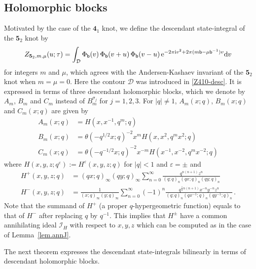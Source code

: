 \documentclass[12pt,reqno]{amsart}
\theoremstyle{definition}
\def\calI{\mathcal I}
\def\calI{\mathcal I}
\def\s{\sigma}
\def\th{\theta}
\def\ve{\varepsilon}
\def\bb{\mathsf{b}}
\def\ri{\mathrm{i}}
\def\rd{\mathrm{d}}
\def\re{{\rm e}}
\def\ri{{\rm i}}
\def\rd{{\rm d}}
\def\mc{\mathcal}
\def\md{\mathbf}
\newcommand{\knot}[1]{\md{#1}}
\begin{document}
\subsection{Holomorphic blocks}
\label{sub.52holo}

Motivated by the case of the $\knot{4}_1$ knot, we define the descendant
state-integral of the $\knot{5}_2$ knot by 
\begin{equation}
  \label{Z52x-desc}
  Z_{\knot{5}_2,m,\mu}(u;\tau) =
  \int_{\mc{D}}  \Phi_\bb(v) \, \Phi_\bb(v+u)
  \, \Phi_\bb(v-u) \, \re^{-2\pi \ri v^2+ 2\pi(m \bb - \mu
    \bb^{-1})v} \rd v 
\end{equation}
for integers $m$ and $\mu$, which agrees with the
Andersen-Kashaev invariant of the $\knot{5}_2$ knot when
$m=\mu=0$. Here the contour
$\mc{D}$ was introduced in \eqref{Z410-desc}. It is expressed in terms of three descendant
holomorphic blocks, which we denote by $A_m$, $B_m$ and $C_m$ instead
of $B^{\s_j}_m$ for $j=1,2,3$.  For $|q| \neq 1$, $A_m(x;q)$,
$B_m(x;q)$ and $C_m(x;q)$ are given by
\begin{subequations}
\begin{align}
  \label{Am}
  A_m(x;q) &=  H(x,x^{-1},q^m;q) \\
  \label{Bm}
  B_m(x;q) &= \th(-q^{1/2}x;q)^{-2}x^m H(x,x^{2},q^m x^2;q) \\
  \label{Cm}
  C_m(x;q) &= \th(-q^{-1/2}x;q)^{-2} x^{-m} H(x^{-1},x^{-2},q^m x^{-2};q)
\end{align}
\end{subequations}
where $H(x,y,z;q^\ve):=H^\ve(x,y,z;q)$ for $|q|<1$ and $\ve=\pm$ and
\begin{subequations}
  \begin{align}
\label{H52p}
H^+(x,y,z;q) & = (qx;q)_\infty (qy;q)_\infty \sum_{n=0}^\infty
\frac{q^{n(n+1)} z^n}{(q;q)_n (qx;q)_n (qy;q)_n} \\
\label{H52n}
H^-(x,y,z;q) & = \frac{1}{(x;q)_\infty (y;q)_\infty}
\sum_{n=0}^\infty (-1)^n \frac{q^{\frac{1}{2}n(n+1)}
  x^{-n} y^{-n}z^n}{ (q;q)_n (qx^{-1};q)_n (qy^{-1};q)_n}
\,.
\end{align}
\end{subequations}
Note that the summand of $H^+$ (a proper
$q$-hypergeometric function) equals to that of $H^-$ after replacing
$q$ by $q^{-1}$. This implies that $H^\pm$ have a common annihilating
ideal $\calI_H$ with respect to $x,y,z$ which can be computed as in
the case of Lemma~\ref{lem.annJ}.

The next theorem expresses the descendant state-integrals bilinearly
in terms of descendant holomorphic blocks.
\end{document}
